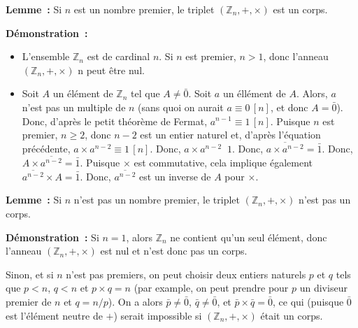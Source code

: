 \medskip

\noindent\textbf{Lemme :} Si $n$ est un nombre premier, le triplet $\left( \mathbb{Z}_n, +, \times \right)$ est un corps. 

\medskip

\noindent\textbf{Démonstration :} 
\begin{itemize}[nosep]
    \item L'ensemble $\mathbb{Z}_n$ est de cardinal $n$. 
        Si $n$ est premier, $n > 1$, donc l'anneau $\left( \mathbb{Z}_n, +, \times \right)$ n peut être nul.
    \item Soit $A$ un élément de $\mathbb{Z}_n$ tel que $A \neq \bar{0}$.
        Soit $a$ un éllément de $A$. 
        Alors, $a$ n'est pas un multiple de $n$ (sans quoi on aurait $a \equiv 0 \, [n]$, et donc $A = \bar{0}$).
        Donc, d'après le petit théorème de Fermat, $a^{n-1} \equiv 1 \, [n]$. 
        Puisque $n$ est premier, $n \geq 2$, donc $n-2$ est un entier naturel et, d'après l'équation précédente, $a \times a^{n-2} \equiv 1 \, [n]$. 
        Donc, $a \times a^{n-2} \mathop{R_n} 1$.
        Donc, $\overline{a \times a^{n-2}} = \bar{1}$.
        Donc, $A \times \overline{a^{n-2}} = \bar{1}$.
        Puisque $\times$ est commutative, cela implique également $\overline{a^{n-2}} \times A = \bar{1}$.
        Donc, $\overline{a^{n-2}}$ est un inverse de $A$ pour $\times$.
\end{itemize}

\done

\medskip

\noindent\textbf{Lemme :} Si $n$ n'est pas un nombre premier, le triplet $\left( \mathbb{Z}_n, +, \times \right)$ n'est pas un corps. 

\medskip

\noindent\textbf{Démonstration :} 
    Si $n = 1$, alors $\mathbb{Z}_n$ ne contient qu'un seul élément, donc l'anneau $\left(\mathbb{Z}_n, +, \times \right)$ est nul et n'est donc pas un corps.

    Sinon, et si $n$ n'est pas premiers, on peut choisir deux entiers naturels $p$ et $q$ tels que $p < n$, $q < n$ et $p \times q = n$ (par example, on peut prendre pour $p$ un diviseur premier de $n$ et $q = n / p$).
    On a alors $\bar{p} \neq \bar{0}$, $\bar{q} \neq \bar{0}$, et $\bar{p} \times \bar{q} = \bar{0}$, ce qui (puisque $\bar{0}$ est l'élément neutre de $+$) serait impossible si $\left(\mathbb{Z}_n, +, \times \right)$ était un corps. 

    \done

